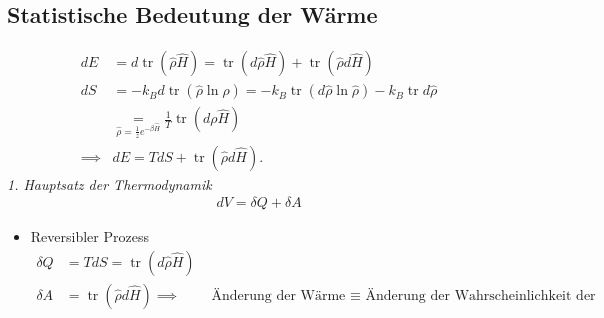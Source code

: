 \documentclass[11pt]{article}
\theoremstyle{plain}
\theoremstyle{mytheoremstyle}
\newcommand{\trace}{\operatorname{tr}}
\begin{document}
\subsection*{Statistische Bedeutung der W\"arme}
%
\begin{align*}
  dE & = d \trace \left( \hat{\rho} \hat{H} \right) = 
  \trace\left( d \hat{\rho} \hat{H} \right) + 
  \trace \left( \hat{\rho} d \hat{H} \right)  \\
  dS & = -k_B d \trace \left( \hat{\rho} \ln{ \hat{\rho}} \right) = 
  - k_B \trace \left( d \hat{\rho} \ln{ \hat{\rho}} \right) - k_B \trace d \hat{\rho} \\
   & \underset{\hat{\rho} = \frac{1}{z } e^{- \beta \hat{ H}}}{=} 
  \frac{1}{T} \trace (d\rho \hat{H}) \\
\implies & dE = T dS + \trace \left( \hat{\rho} d \hat{H} \right).
\end{align*}
\emph{1. Hauptsatz der Thermodynamik} 
%
\begin{align*}
  dV = \delta Q + \delta A
\end{align*}
%
\begin{itemize}
  \item Reversibler Prozess
    \begin{align*}
      \delta Q & = T dS = \trace \left( d \hat{\rho} \hat{H} \right) \\
      \delta A & = \trace \left( \hat{\rho} d \hat{H} \right)
      \implies & \text{ \"Anderung der W\"arme $\equiv$ 
    \"Anderung der Wahrscheinlichkeit der Mikrozust\"ande}
    \end{align*}
\end{itemize}
\end{document}
